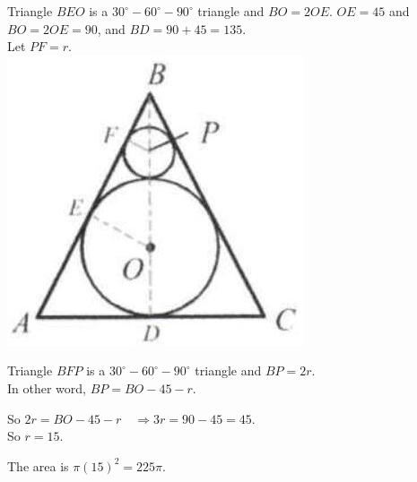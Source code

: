 \documentclass{article}
\begin{document}
Triangle \(B E O\) is a \(30^{\circ}-60^{\circ}-90^{\circ}\) triangle and \(B O=2 O E\). \(O E=45\) and \(B O=2 O E=90\), and \(B D=90+45=135\).\\
Let \(P F=r\).\\
\centering
\includegraphics[width=\textwidth]{images/reasoning_image_1.jpg}

Triangle \(B F P\) is a \(30^{\circ}-60^{\circ}-90^{\circ}\) triangle and \(B P=2 r\).\\
In other word, \(B P=B O-45-r\).

So \(2 r=B O-45-r \quad \Rightarrow 3 r=90-45=45\).\\
So \(r=15\).

The area is \(\pi(15)^{2}=225 \pi\).
\end{document}
